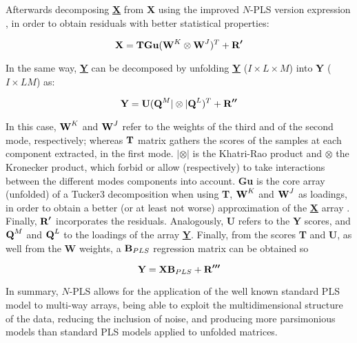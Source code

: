 Afterwards decomposing \textbf{\underline{X}} from \textbf{X} using the improved $N$-PLS version expression \parencite{bro2001difference}, in order to obtain residuals with better statistical properties:

\begin{equation}
\textbf{\text{X}}=\textbf{\text{T}}\textbf{\text{Gu}}(\textbf{\text{W}}^{K}\otimes{}\textbf{\text{W}}^{J})^{T}+\textbf{\text{R}}^{\boldsymbol{\prime{}}}
\label{equation02}
\end{equation}

In the same way, \textbf{\underline{Y}} can be decomposed by unfolding \textbf{\underline{Y}} ($I \times L \times M$) into \textbf{Y} ($I \times LM$) as:

\begin{equation}
\textbf{\text{Y}}=\textbf{\text{U}}(\textbf{\text{Q}}^{M}|\otimes{}|\textbf{\text{Q}}^{L})^{T}+\textbf{\text{R}}^{\boldsymbol{\prime{}\prime{}}}
\label{equation03}
\end{equation}

In this case, $\textbf{\text{W}}^{K}$ and $\textbf{\text{W}}^{J}$ refer to the weights of the third and of the second mode, respectively; whereas $\textbf{\text{T}}$ matrix gathers the scores of the samples at each component extracted, in the first mode. $|\otimes{}|$ is the Khatri-Rao product and $\otimes{}$ the Kronecker product, which forbid or allow (respectively) to take interactions between the different modes components into account. 
\textbf{Gu} is the core array (unfolded) of a Tucker3 decomposition when using \textbf{T}, $\textbf{\text{W}}^{K}$ and $\textbf{\text{W}}^{J}$ as loadings, in order to obtain a better (or at least not worse) approximation of the \textbf{\underline{X}} array \parencite{smilde2005multi}. Finally, $\textbf{\text{R}}^{\boldsymbol{\prime{}}}$ incorporates the residuals. Analogously, \textbf{U} refers to the \textbf{Y} scores, and $\textbf{\text{Q}}^{M}$ and $\textbf{\text{Q}}^{L}$ to the loadings of the array \textbf{\underline{Y}}.
Finally, from the scores \textbf{T} and \textbf{U}, as well from the \textbf{W} weights, a $\textbf{\text{B}}_{PLS}$ regression matrix can be obtained \parencite{bro1998multi} so

\begin{equation}
\textbf{\text{Y}}=\textbf{\text{X}}\textbf{\text{B}}_{PLS}+\textbf{\text{R}}^{\boldsymbol{\prime{}\prime{}\prime{}}}
\label{equation04}
\end{equation}

In summary, $N$-PLS allows for the application of the well known standard PLS model to multi-way arrays, being able to exploit the multidimensional structure of the data, reducing the inclusion of noise, and producing more parsimonious models than standard PLS models applied to unfolded matrices. 

